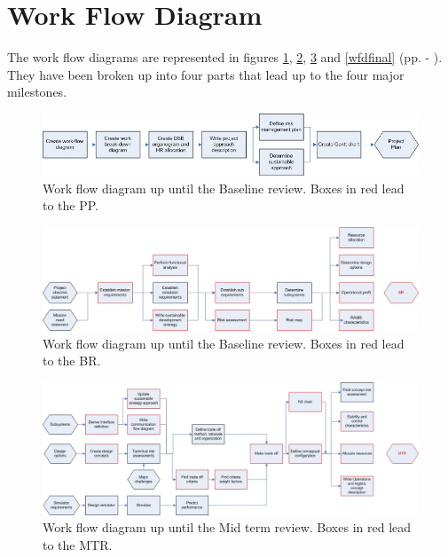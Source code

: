 \section{Work Flow Diagram}
\label{dsePPWFD}
The work flow diagrams are represented in figures \ref{wfdproject}, \ref{wfdbase}, \ref{wfdmid} and \ref{wfdfinal} (pp. \pageref{wfdproject} - \pageref{wfdfinal}). They have been broken up into four parts that lead up to the four major milestones.

\begin{figure}[H]
\begin{center}
\includegraphics[width=1.2\textwidth, angle=90]{chapters/img/Workflow_diagram_PP.jpg}
\end{center}
\caption{Work flow diagram up until the Baseline review. Boxes in red lead to the PP.}
\label{wfdproject}
\end{figure}

\begin{figure}[H]
\begin{center}
\includegraphics[width=1.2\textwidth, angle=90]{chapters/img/Workflow_diagram_BR.jpg}
\end{center}
\caption{Work flow diagram up until the Baseline review. Boxes in red lead to the BR.}
\label{wfdbase}
\end{figure}

\begin{figure}[H]
\begin{center}
\includegraphics[width=1.2\textwidth, angle=90]{chapters/img/Workflow_diagram_MTR.jpg}
\end{center}
\caption{Work flow diagram up until the Mid term review. Boxes in red lead to the MTR.}
\label{wfdmid}
\end{figure}


